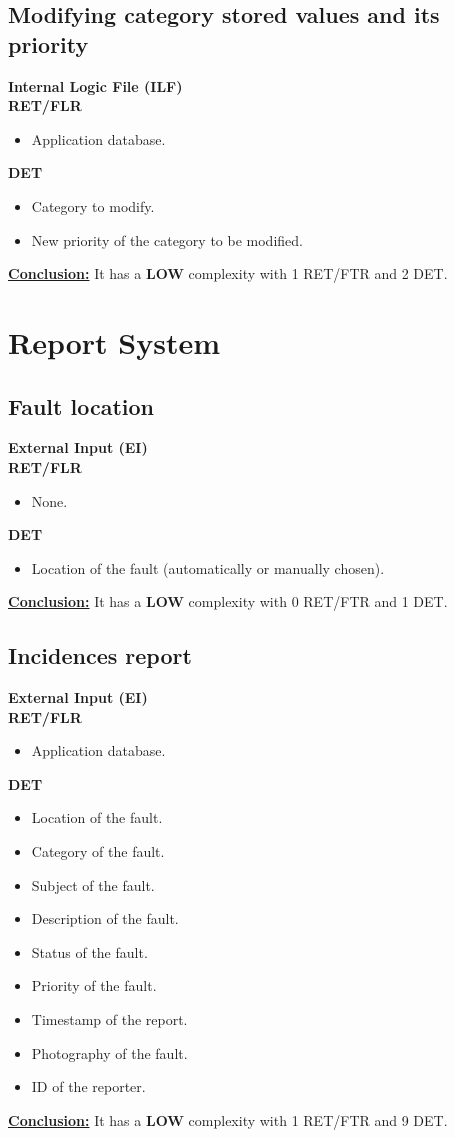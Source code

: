 \subsection{Modifying category stored values and its priority}
\textbf{Internal Logic File (ILF)} \\ 
\textbf{RET/FLR}
\begin{itemize}
\item Application database.
\end{itemize}
\textbf{DET}
\begin{itemize}
\item Category to modify.
\item New priority of the category to be modified.
\end{itemize}
\textbf{\underline{Conclusion:}} It has a \textbf{LOW} complexity with 1 RET/FTR and 2 DET.	



\section{Report System}



\subsection{Fault location}
\textbf{External Input (EI)} \\ 
\textbf{RET/FLR}
\begin{itemize}
\item None.
\end{itemize}
\textbf{DET}
\begin{itemize}
\item Location of the fault (automatically or manually chosen).
\end{itemize}
\textbf{\underline{Conclusion:}} It has a \textbf{LOW} complexity with 0 RET/FTR and 1 DET.

\subsection{Incidences report}
\textbf{External Input (EI)} \\ 
\textbf{RET/FLR}
\begin{itemize}
\item Application database.
\end{itemize}
\textbf{DET}
\begin{itemize}
\item Location of the fault.
\item Category of the fault.
\item Subject of the fault.
\item Description of the fault.
\item Status of the fault.
\item Priority of the fault.
\item Timestamp of the report.
\item Photography of the fault.
\item ID of the reporter.
\end{itemize}
\textbf{\underline{Conclusion:}} It has a \textbf{LOW} complexity with 1 RET/FTR and 9 DET.

